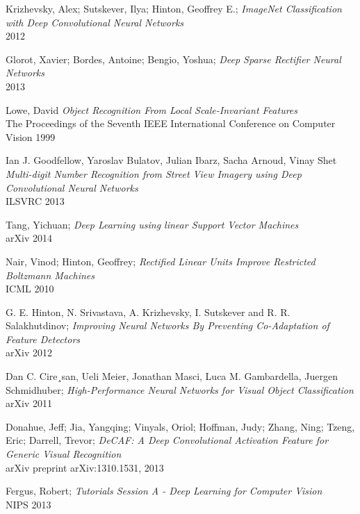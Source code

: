 \documentclass[a4paper,11pt]{article}
\begin{document}
\begin{thebibliography}{1}

 Krizhevsky, Alex; Sutskever, Ilya; Hinton, Geoffrey E.;
 \emph{ImageNet Classification with Deep Convolutional Neural Networks}\\
 2012

 Glorot, Xavier; Bordes, Antoine; Bengio, Yoshua;
 \emph{Deep Sparse Rectifier Neural Networks}\\
 2013
 
 Lowe, David
 \emph{Object Recognition From Local Scale-Invariant Features}\\
 The Proceedings of the Seventh IEEE International Conference on Computer Vision
 1999 
 
 Ian J. Goodfellow, Yaroslav Bulatov, Julian Ibarz, Sacha Arnoud, Vinay Shet
  \emph{Multi-digit Number Recognition from Street View Imagery using Deep Convolutional Neural Networks}\\
  ILSVRC 2013

 Tang, Yichuan;
 \emph{Deep Learning using linear Support Vector Machines}\\
 arXiv 2014

 Nair, Vinod; Hinton, Geoffrey;
  \emph{Rectified Linear Units Improve Restricted Boltzmann Machines}\\
  ICML 2010

 G. E. Hinton, N. Srivastava, A. Krizhevsky, I. Sutskever and R. R. Salakhutdinov;
 \emph{Improving Neural Networks By Preventing Co-Adaptation of Feature Detectors}\\
 arXiv 2012

 Dan C. Cire¸san, Ueli Meier, Jonathan Masci, Luca M. Gambardella, Juergen Schmidhuber;
 \emph{High-Performance Neural Networks for Visual Object Classification}\\
 arXiv 2011

 Donahue, Jeff; Jia, Yangqing; Vinyals, Oriol; Hoffman, Judy; Zhang, Ning; Tzeng, Eric; Darrell, Trevor;
  \emph{DeCAF: A Deep Convolutional Activation Feature for Generic Visual Recognition}\\
  arXiv preprint arXiv:1310.1531, 2013
  
 Fergus, Robert;
 \emph{Tutorials Session A - Deep Learning for Computer Vision}\\
 NIPS 2013  
  

\end{thebibliography}
\end{document}

